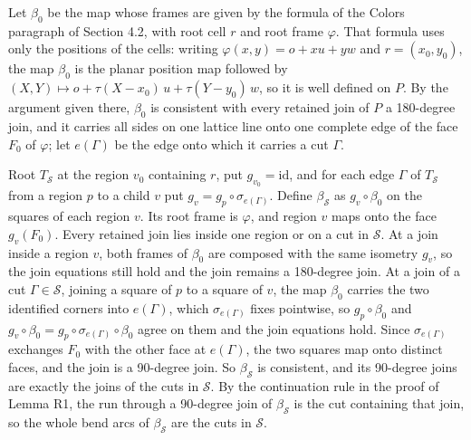 \documentclass[
  11pt,
]{article}
\begin{document}
Let \(\beta_0\) be the map whose frames are given by the formula of the
Colors paragraph of Section 4.2, with root cell \(r\) and root frame
\(\varphi\). That formula uses only the positions of the cells: writing
\(\varphi(x,y)=o+xu+yw\) and \(r=(x_0,y_0)\), the map \(\beta_0\) is the
planar position map followed by
\((X,Y)\mapsto o+\tau(X-x_0)\,u+\tau(Y-y_0)\,w\), so it is well defined
on \(P\). By the argument given there, \(\beta_0\) is consistent with
every retained join of \(P\) a 180-degree join, and it carries all sides
on one lattice line onto one complete edge of the face \(F_0\) of
\(\varphi\); let \(e(\Gamma)\) be the edge onto which it carries a cut
\(\Gamma\).

Root \(T_{\mathcal S}\) at the region \(v_0\) containing \(r\), put
\(g_{v_0}=\mathrm{id}\), and for each edge \(\Gamma\) of
\(T_{\mathcal S}\) from a region \(p\) to a child \(v\) put
\(g_v=g_p\circ\sigma_{e(\Gamma)}\). Define \(\beta_{\mathcal S}\) as
\(g_v\circ\beta_0\) on the squares of each region \(v\). Its root frame
is \(\varphi\), and region \(v\) maps onto the face \(g_v(F_0)\). Every
retained join lies inside one region or on a cut in \(\mathcal S\). At a
join inside a region \(v\), both frames of \(\beta_0\) are composed with
the same isometry \(g_v\), so the join equations still hold and the join
remains a 180-degree join. At a join of a cut \(\Gamma\in\mathcal S\),
joining a square of \(p\) to a square of \(v\), the map \(\beta_0\)
carries the two identified corners into \(e(\Gamma)\), which
\(\sigma_{e(\Gamma)}\) fixes pointwise, so \(g_p\circ\beta_0\) and
\(g_v\circ\beta_0=g_p\circ\sigma_{e(\Gamma)}\circ\beta_0\) agree on them
and the join equations hold. Since \(\sigma_{e(\Gamma)}\) exchanges
\(F_0\) with the other face at \(e(\Gamma)\), the two squares map onto
distinct faces, and the join is a 90-degree join. So
\(\beta_{\mathcal S}\) is consistent, and its 90-degree joins are
exactly the joins of the cuts in \(\mathcal S\). By the continuation
rule in the proof of Lemma R1, the run through a 90-degree join of
\(\beta_{\mathcal S}\) is the cut containing that join, so the whole
bend arcs of \(\beta_{\mathcal S}\) are the cuts in \(\mathcal S\).
\end{document}
